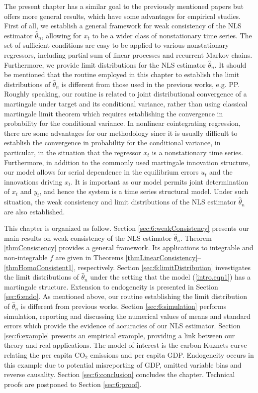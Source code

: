 The present chapter has a similar goal to the previously mentioned papers but offers more general results, which have some advantages for empirical studies. First of all, we establish a general framework for  weak consistency of the NLS estimator $\hat{\theta}_n$, allowing for $x_t$ to be  a  wider class of nonstationary time series.
 The set of sufficient conditions are easy to be applied to various nonstationary regressors, including partial sum of linear processes and recurrent Markov chains. Furthermore, we  provide limit distributions for the NLS estimator $\hat{\theta}_n$. It  should be mentioned that  the routine employed in this chapter to establish the limit distributions of $\hat\theta_n$ is different from those used in the previous works, e.g. PP. Roughly speaking, our routine is related to joint distributional convergence of a martingale under target and its conditional variance, rather than using classical martingale limit theorem which requires establishing the convergence in probability for the conditional variance.  In nonlinear cointegrating regression, there are   some advantages for our methodology  since it is usually difficult to establish the convergence in probability for the conditional variance, in particular, in the situation that the regressor $x_t$ is a nonstationary time series.
Furthermore, in addition to the commonly used martingale innovation structure, our model allows for serial dependence in the equilibrium errors $u_t$ and the innovations driving $x_t$. It is important as our model  permits joint determination of $x_t$ and $y_t$, and hence the system is a time series structural model. Under such situation, the weak consistency and limit distributions of the NLS estimator $\hat{\theta}_n$ are also established.

This chapter is organized as follow. Section \ref{sec:6:weakConsistency} presents our main results on weak consistency of the NLS estimator $\hat \theta_n$. Theorem \ref{thmConsistency} provides a general framework.  Its applications to integrable and non-integrable $f$  are given in Theorems \ref{thmLinearConsistency}--\ref{thmHomoConsistent1}, respectively.  Section \ref{sec:6:limitDistribution} investigates the limit distributions of $\hat \theta_n$ under the setting that the model (\ref {intro.eqn1}) has a martingale structure. Extension to endogeneity is presented in Section \ref{sec:6:endo}. As mentioned above, 
our routine establishing the limit distribution of $\hat \theta_n$ is different from previous works. Section \ref{sec:6:simulation} performs simulation,  reporting and discussing the numerical values of means and standard errors which provide the evidence of accuracies of our NLS estimator. Section \ref{sec:6:example} presents  an empirical example,  providing a link between our theory and real applications. The model of interest is the carbon Kuznets curve relating the per capita CO$_2$ emissions and per capita GDP. Endogeneity occurs in this example due to potential misreporting of GDP, omitted variable bias and reverse causality. Section \ref{sec:6:conclusion} concludes the chapter. Technical proofs are postponed to Section \ref{sec:6:proof}.

